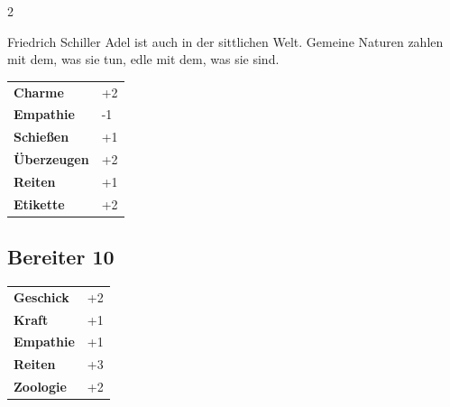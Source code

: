 \begin{multicols}{2}
\begin{tcolorbox}
\begin{pquote}{Friedrich Schiller}
Adel ist auch in der sittlichen Welt. Gemeine Naturen zahlen mit dem, was sie tun, edle mit dem, was sie sind.
\end{pquote}

\vspace{3mm}

\begin{tabular}{@{}ll@{}}
    \textbf{Charme} & +2\\
    \textbf{Empathie} & -1\\
    \textbf{Schießen} & +1\\
    \textbf{Überzeugen} & +2\\
    \textbf{Reiten} & +1\\
    \textbf{Etikette} & +2\\
\end{tabular}


\end{tcolorbox}

\begin{tcolorbox}
    \subsection*{Bereiter \hfill \small{10 }}
    \tcblower




\begin{tabular}{@{}ll@{}}
    \textbf{Geschick} & +2\\
    \textbf{Kraft} & +1\\
    \textbf{Empathie} & +1\\
    \textbf{Reiten} & +3\\
    \textbf{Zoologie} & +2\\
\end{tabular}


\end{tcolorbox}


\end{multicols}
